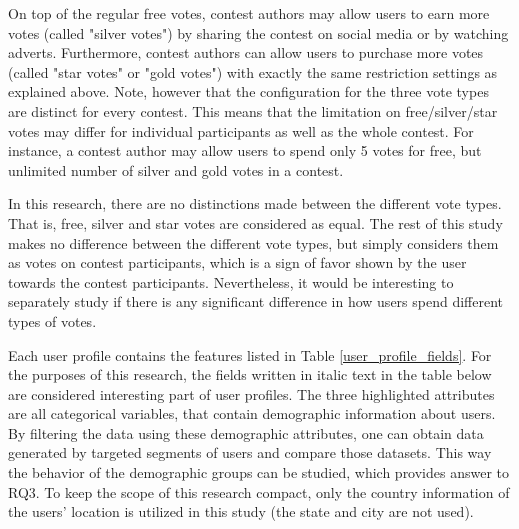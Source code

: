 On top of the regular free votes, contest authors may allow users to earn more votes (called "silver votes") by sharing the contest on social media or by watching adverts. Furthermore, contest authors can allow users to purchase more votes (called "star votes" or "gold votes") with exactly the same restriction settings as explained above. Note, however that the configuration for the three vote types are distinct for every contest. This means that the limitation on free/silver/star votes may differ for individual participants as well as the whole contest. For instance, a contest author may allow users to spend only 5 votes for free, but unlimited number of silver and gold votes in a contest. 

In this research, there are no distinctions made between the different vote types. That is, free, silver and star votes are considered as equal. The rest of this study makes no difference between the different vote types, but simply considers them as votes on contest participants, which is a sign of favor shown by the user towards the contest participants. Nevertheless, it would be interesting to separately study if there is any significant difference in how users spend different types of votes. 

Each user profile contains the features listed in Table \ref{user_profile_fields}. For the purposes of this research, the fields written in italic text in the table below are considered interesting part of user profiles. The three highlighted attributes are all categorical variables, that contain demographic information about users. By filtering the data using these demographic attributes, one can obtain data generated by targeted segments of users and compare those datasets. This way the behavior of the demographic groups can be studied, which provides answer to RQ3. To keep the scope of this research compact, only the country information of the users' location is utilized in this study (the state and city are not used).

